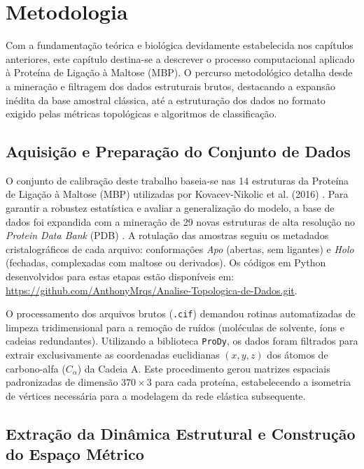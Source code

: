 \documentclass[12pt, a4paper]{article}
\theoremstyle{plain}
\theoremstyle{definition}
\theoremstyle{remark}
\newcommand{\ident}{\hspace{2em}}
\begin{document}
\section{Metodologia}

\ident Com a fundamentação teórica e biológica devidamente estabelecida nos capítulos anteriores, este capítulo destina-se a descrever o processo computacional aplicado à Proteína de Ligação à Maltose (MBP). O percurso metodológico detalha desde a mineração e filtragem dos dados estruturais brutos, destacando a expansão inédita da base amostral clássica, até a estruturação dos dados no formato exigido pelas métricas topológicas e algoritmos de classificação.

\subsection{Aquisição e Preparação do Conjunto de Dados}

\ident O conjunto de calibração deste trabalho baseia-se nas 14 estruturas da Proteína de Ligação à Maltose (MBP) utilizadas por Kovacev-Nikolic et al. (2016) \cite{kovacev2016}. Para garantir a robustez estatística e avaliar a generalização do modelo, a base de dados foi expandida com a mineração de 29 novas estruturas de alta resolução no \textit{Protein Data Bank} (PDB) \cite{Bernstein1977}. A rotulação das amostras seguiu os metadados cristalográficos de cada arquivo: conformações \textit{Apo} (abertas, sem ligantes) e \textit{Holo} (fechadas, complexadas com maltose ou derivados). Os códigos em Python desenvolvidos para estas etapas estão disponíveis em: \url{https://github.com/AnthonyMrqs/Analise-Topologica-de-Dados.git}.

\ident O processamento dos arquivos brutos (\texttt{.cif}) demandou rotinas automatizadas de limpeza tridimensional para a remoção de ruídos (moléculas de solvente, íons e cadeias redundantes). Utilizando a biblioteca \texttt{ProDy}, os dados foram filtrados para extrair exclusivamente as coordenadas euclidianas $(x,y,z)$ dos átomos de carbono-alfa ($C_\alpha$) da Cadeia A. Este procedimento gerou matrizes espaciais padronizadas de dimensão $370 \times 3$ para cada proteína, estabelecendo a isometria de vértices necessária para a modelagem da rede elástica subsequente.

\subsection{Extração da Dinâmica Estrutural e Construção do Espaço Métrico}
\end{document}
